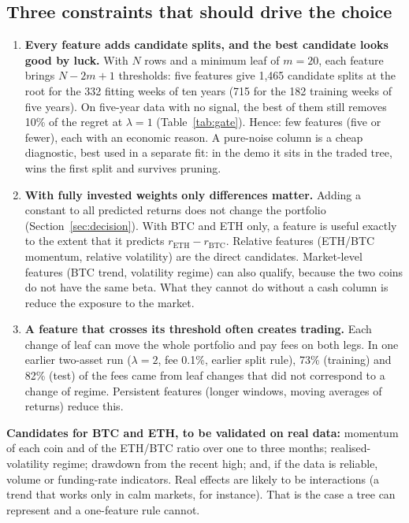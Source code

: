 \documentclass[11pt,a4paper]{article}
\newcommand{\1}{\mathbf{1}}
\begin{document}
\subsection{Three constraints that should drive the choice}
\begin{enumerate}
\item \textbf{Every feature adds candidate splits, and the best candidate looks good by luck.} With $N$ rows and a minimum leaf of $m=20$, each feature brings $N-2m+1$ thresholds: five features give 1,465 candidate splits at the root for the 332 fitting weeks of ten years (715 for the 182 training weeks of five years). On five-year data with no signal, the best of them still removes 10\% of the regret at $\lambda=1$ (Table~\ref{tab:gate}). Hence: few features (five or fewer), each with an economic reason. A pure-noise column is a cheap diagnostic, best used in a separate fit: in the demo it sits in the traded tree, wins the first split and survives pruning.
\item \textbf{With fully invested weights only differences matter.} Adding a constant to all predicted returns does not change the portfolio (Section~\ref{sec:decision}). With BTC and ETH only, a feature is useful exactly to the extent that it predicts $r_{\text{ETH}}-r_{\text{BTC}}$. Relative features (ETH/BTC momentum, relative volatility) are the direct candidates. Market-level features (BTC trend, volatility regime) can also qualify, because the two coins do not have the same beta. What they cannot do without a cash column is reduce the exposure to the market.
\item \textbf{A feature that crosses its threshold often creates trading.} Each change of leaf can move the whole portfolio and pay fees on both legs. In one earlier two-asset run ($\lambda=2$, fee 0.1\%, earlier split rule), 73\% (training) and 82\% (test) of the fees came from leaf changes that did not correspond to a change of regime. Persistent features (longer windows, moving averages of returns) reduce this.
\end{enumerate}

\textbf{Candidates for BTC and ETH, to be validated on real data:} momentum of each coin and of the ETH/BTC ratio over one to three months; realised-volatility regime; drawdown from the recent high; and, if the data is reliable, volume or funding-rate indicators. Real effects are likely to be interactions (a trend that works only in calm markets, for instance). That is the case a tree can represent and a one-feature rule cannot.
\end{document}
